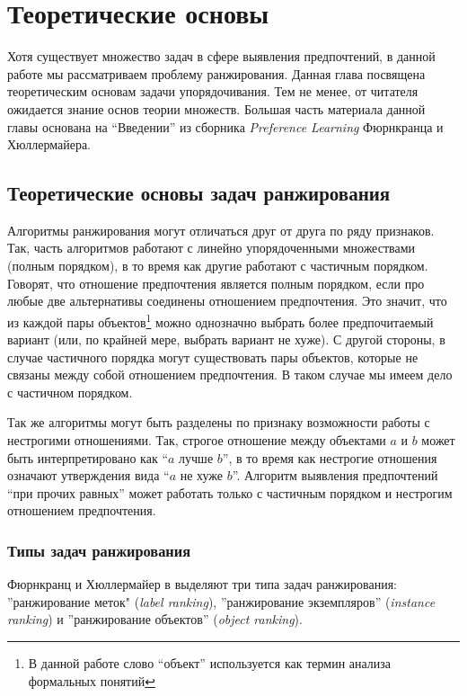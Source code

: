 \chapter{Теоретические основы}
\label{chapter:theory}

Хотя существует множество задач в сфере выявления предпочтений, в данной работе мы рассматриваем проблему ранжирования. Данная глава посвящена теоретическим основам задачи упорядочивания. Тем не менее, от читателя ожидается знание основ теории множеств. Большая часть материала данной главы основана на \enquote{Введении} из сборника \textit{Preference Learning} Фюрнкранца и Хюллермайера\cite{plbook:Introduction:2010}.


\section{Теоретические основы задач ранжирования}

	Алгоритмы ранжирования могут отличаться друг от друга по ряду признаков. Так, часть алгоритмов работают с линейно упорядоченными множествами (полным порядком), в то время как другие работают с частичным порядком. Говорят, что отношение предпочтения является полным порядком, если про любые две альтернативы соединены отношением предпочтения. Это значит, что из каждой пары объектов\footnote{В данной работе слово \enquote{объект} используется как термин анализа формальных понятий} можно однозначно выбрать более предпочитаемый вариант (или, по крайней мере, выбрать вариант не хуже). С другой стороны, в случае частичного порядка могут существовать пары объектов, которые не связаны между собой отношением предпочтения. В таком случае мы имеем дело с частичном порядком. 
	
	Так же алгоритмы могут быть разделены по признаку возможности работы с нестрогими отношениями. Так, строгое отношение между объектами $a$ и $b$ может быть интерпретировано как \enquote{$a$ лучше $b$}, в то время как нестрогие отношения означают утверждения вида \enquote{$a$ не хуже $b$}.\cite[p.~384]{Barten:1982} Алгоритм выявления предпочтений \enquote{при прочих равных} может работать только с частичным порядком и нестрогим отношением предпочтения.

\subsection{Типы задач ранжирования}
	Фюрнкранц и Хюллермайер в \cite{plbook:Introduction:2010} выделяют три типа задач ранжирования: ''ранжирование меток" (\emph{label ranking}), ''ранжирование экземпляров'' (\emph{instance ranking}) и ''ранжирование объектов'' (\emph{object ranking}).
	
